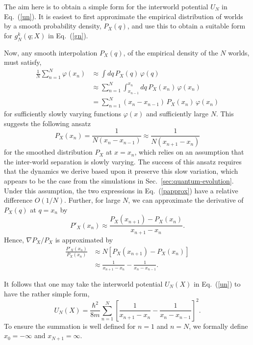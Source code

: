 \documentclass[12pt, aps,pra,amsmath,amssymb,superscriptaddress]{revtex4-2}
\newcommand{\erf}[1]{Eq.~(\ref{#1})}
\renewcommand{\(}{\left(}
\renewcommand{\)}{\right)}
\newcommand{\blk}{\color{black}}
\newcommand{\blu}{\color{blue}}
\renewcommand\blu{\blk}
\begin{document}
The aim here is to obtain a simple form for the interworld potential $U_N$ in Eq.~(\ref{un}).  It is easiest to first approximate the empirical distribution of worlds by a smooth probability density, $P_{X}(q)$, and use this to obtain a suitable form for $g_N^k({q} ;{X})$ in Eq.~(\ref{gn}).

Now, any smooth interpolation $P_{X}(q)$, of the empirical density of the $N$ worlds, must satisfy,
\begin{align*} 
\frac{1}{N} \sum_{n=1}^N { \varphi}(x_n) &\approx \int dq\,P_{X}(q)\,{ \varphi}(q)\\
&\approx \sum_{n=1}^N \int_{x_{n-1}}^{x_{n}} dq\, P_{X}(x_n)\,{ \varphi}(x_n)\\
& = \sum_{n=1}^N (x_{n}-x_{n-1})\,P_{X}(x_n)\,{ \varphi}(x_n)
\end{align*}
 for sufficiently slowly varying functions ${ \varphi}(x)$ 
 and sufficiently large $N$.
 This suggests the following ansatz  
\begin{equation} \label{papprox}
 P_{X}(x_n) = \frac{1}{N(x_{n}-x_{n-1})} \approx \frac{1}{N(x_{n+1}-x_n)} 
\end{equation}
for the smoothed distribution $P_X$ \blu at $x=x_n$, \blk  which relies on an assumption that the 
inter-world separation is slowly varying. The success of this ansatz requires that the dynamics 
we derive based upon it preserve this slow variation, which appears to be the case from 
the simulations in Sec.~\ref{sec:quantum-evolution}.  
Under this assumption, the two expressions in \erf{papprox} have a relative difference $O(1/N)$. 
Further, for large $N$, we can approximate the derivative of $P_{X}(q)$ at $q=x_n$ by
\begin{equation} \label{toygrad} 
P'_{X}(x_n)\approx \frac{P_{X}(x_{n+1}) - P_{X}(x_n)}{x_{n+1}-x_n}. 
\end{equation}
Hence, $\nabla P_{X}/P_{X}$ is approximated by
\begin{align*} 
\frac{P'_{X}(x_n)}{P_{X}(x_n)} &\approx N[P_{X}(x_{n+1}) - P_{X}(x_n)]\\
&\approx \frac{1}{x_{n+1}-x_n} - \frac{1}{x_{n}-x_{n-1}} .
\end{align*}

It follows that one may take the interworld potential $U_N({X})$ in Eq.~(\ref{un}) to have the rather simple form, 
\begin{equation} \label{un1d}
U_N({X}) = \frac{\hbar^2}{8m} \sum_{n=1}^N \left[ \frac{1}{x_{n+1}-x_n} - \frac{1}{x_{n}-x_{n-1}} \right]^2 .
\end{equation}
To ensure the summation is well defined for $n=1$ and $n=N$, we formally define $x_0=-\infty$ and $x_{N+1}=\infty$. 
\end{document}
